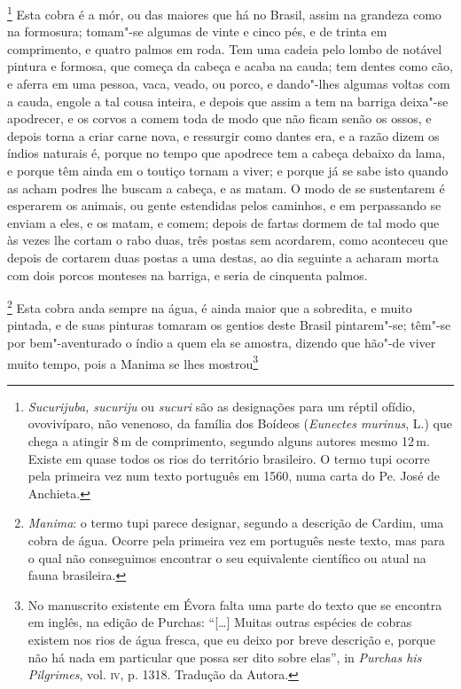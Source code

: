 \footnote{ \textit{Sucurijuba, sucuriju}
ou \textit{sucuri} são as designações para um réptil ofídio,
ovovivíparo, não venenoso, da família dos Boídeos (\textit{Eunectes
murinus}, L.) que chega a atingir 8\,m de comprimento, segundo alguns
autores mesmo 12\,m. Existe em quase todos os rios do território
brasileiro. O termo tupi ocorre pela primeira vez num texto português
em 1560, numa carta do Pe. José de Anchieta.} Esta
cobra é a mór, ou das maiores que há no Brasil, assim na grandeza como
na formosura; tomam"-se algumas de vinte e cinco pés, e de trinta em
comprimento, e quatro palmos em roda. Tem uma cadeia pelo lombo de
notável pintura e formosa, que começa da cabeça e acaba na cauda; tem
dentes como cão, e aferra em uma pessoa, vaca, veado, ou porco, e
dando"-lhes algumas voltas com a cauda, engole a tal cousa inteira, e
depois que assim a tem na barriga deixa"-se apodrecer, e os corvos a
comem toda de modo que não ficam senão os ossos, e depois torna a criar
carne nova, e ressurgir como dantes era, e a razão dizem os índios
naturais é, porque no tempo que apodrece tem a cabeça debaixo da lama,
e porque têm ainda em o toutiço tornam a viver; e porque já se sabe
isto quando as acham podres lhe buscam a cabeça, e as matam. O modo de
se sustentarem é esperarem os animais, ou gente estendidas pelos
caminhos, e em perpassando se enviam a eles, e os matam, e comem;
depois de fartas dormem de tal modo que às vezes lhe cortam o rabo
duas, três postas sem acordarem, como aconteceu que depois de cortarem
duas postas a uma destas, ao dia seguinte a acharam morta com dois
porcos monteses na barriga, e seria de cinquenta palmos.

\footnote{ \textit{Manima}: o termo tupi parece
designar, segundo a descrição de Cardim, uma cobra de água. Ocorre pela
primeira vez em português neste texto, mas para o qual não conseguimos
encontrar o seu equivalente científico ou atual na fauna
brasileira.} Esta cobra anda sempre na água, é ainda maior
que a sobredita, e muito pintada, e de suas pinturas tomaram os gentios
deste Brasil pintarem"-se; têm"-se por bem"-aventurado o índio a quem ela
se amostra, dizendo que hão"-de viver muito tempo, pois a Manima se lhes
mostrou\footnote{ No manuscrito existente em Évora falta uma parte
do texto que se encontra em inglês, na edição de Purchas: ``[\ldots{}] 
Muitas outras espécies de cobras existem nos rios de água fresca, que
eu deixo por breve descrição e, porque não há nada em particular que
possa ser dito sobre elas'', in \textit{Purchas his Pilgrimes}, vol.
\textsc{iv}, p. 1318. Tradução da Autora.} 


